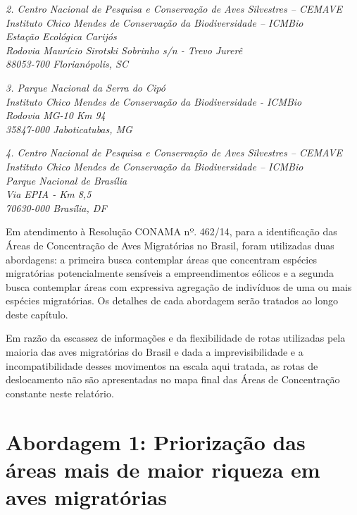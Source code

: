 \documentclass[
  oneside]{scrbook}
\begin{document}
\emph{2. Centro Nacional de Pesquisa e Conservação de Aves Silvestres -- CEMAVE}\\
\emph{Instituto Chico Mendes de Conservação da Biodiversidade -- ICMBio}\\
\emph{Estação Ecológica Carijós}\\
\emph{Rodovia Maurício Sirotski Sobrinho s/n - Trevo Jurerê}\\
\emph{88053-700 Florianópolis, SC}

\emph{3. Parque Nacional da Serra do Cipó}\\
\emph{Instituto Chico Mendes de Conservação da Biodiversidade - ICMBio}\\
\emph{Rodovia MG-10 Km 94}\\
\emph{35847-000 Jaboticatubas, MG}

\emph{4. Centro Nacional de Pesquisa e Conservação de Aves Silvestres -- CEMAVE}\\
\emph{Instituto Chico Mendes de Conservação da Biodiversidade -- ICMBio}\\
\emph{Parque Nacional de Brasília}\\
\emph{Via EPIA - Km 8,5}\\
\emph{70630-000 Brasília, DF}

Em atendimento à Resolução CONAMA nº. 462/14, para a identificação das Áreas de Concentração de Aves Migratórias no Brasil, foram utilizadas duas abordagens: a primeira busca contemplar áreas que concentram espécies migratórias potencialmente sensíveis a empreendimentos eólicos e a segunda busca contemplar áreas com expressiva agregação de indivíduos de uma ou mais espécies migratórias. Os detalhes de cada abordagem serão tratados ao longo deste capítulo.

Em razão da escassez de informações e da flexibilidade de rotas utilizadas pela maioria das aves migratórias do Brasil e dada a imprevisibilidade e a incompatibilidade desses movimentos na escala aqui tratada, as rotas de deslocamento não são apresentadas no mapa final das Áreas de Concentração constante neste relatório.

\hypertarget{abordagem-1-priorizauxe7uxe3o-das-uxe1reas-mais-de-maior-riqueza-em-aves-migratuxf3rias}{%
\section{Abordagem 1: Priorização das áreas mais de maior riqueza em aves migratórias}\label{abordagem-1-priorizauxe7uxe3o-das-uxe1reas-mais-de-maior-riqueza-em-aves-migratuxf3rias}}
\end{document}
